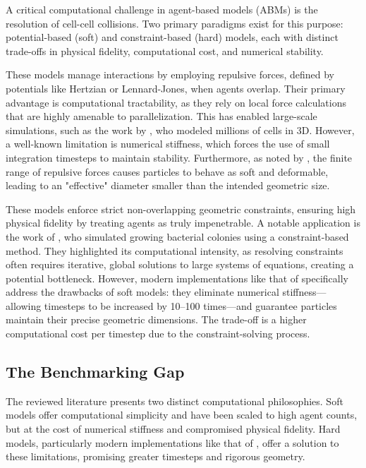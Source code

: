 \documentclass[conference]{IEEEtran}
\begin{document}
A critical computational challenge in agent-based models (ABMs) is the resolution of cell-cell collisions. Two primary paradigms exist for this purpose: potential-based (soft) and constraint-based (hard) models, each with distinct trade-offs in physical fidelity, computational cost, and numerical stability.

\begin{description}[style=nextline]
    \item[Potential-Based (Soft) Collision Models]
        These models manage interactions by employing repulsive forces, defined by potentials like Hertzian or Lennard-Jones, when agents overlap. Their primary advantage is computational tractability, as they rely on local force calculations that are highly amenable to parallelization. This has enabled large-scale simulations, such as the work by \cite{Warren2019}, who modeled millions of cells in 3D. However, a well-known limitation is numerical stiffness, which forces the use of small integration timesteps to maintain stability. Furthermore, as noted by \cite{Yan2019}, the finite range of repulsive forces causes particles to behave as soft and deformable, leading to an "effective" diameter smaller than the intended geometric size.

    \item[Constraint-Based (Hard) Collision Models]
        These models enforce strict non-overlapping geometric constraints, ensuring high physical fidelity by treating agents as truly impenetrable. A notable application is the work of \cite{Rudge2012}, who simulated growing bacterial colonies using a constraint-based method. They highlighted its computational intensity, as resolving constraints often requires iterative, global solutions to large systems of equations, creating a potential bottleneck. However, modern implementations like that of \cite{Yan2019} specifically address the drawbacks of soft models: they eliminate numerical stiffness—allowing timesteps to be increased by 10–100 times—and guarantee particles maintain their precise geometric dimensions. The trade-off is a higher computational cost per timestep due to the constraint-solving process.
\end{description}

\subsection{The Benchmarking Gap}

The reviewed literature presents two distinct computational philosophies. Soft models offer computational simplicity and have been scaled to high agent counts, but at the cost of numerical stiffness and compromised physical fidelity. Hard models, particularly modern implementations like that of \cite{Yan2019}, offer a solution to these limitations, promising greater timesteps and rigorous geometry.
\end{document}
